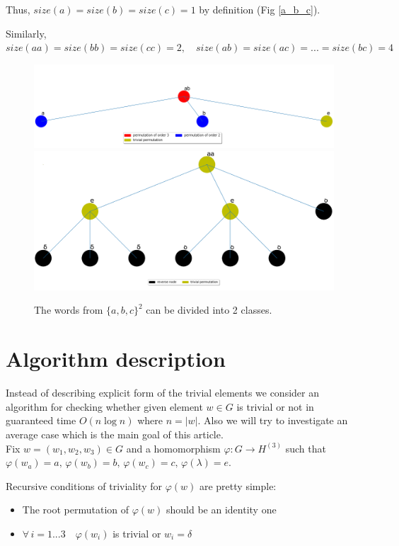 \documentclass[a4paper,12pt]{amsart}
\begin{document}
Thus, $size(a) = size(b) = size(c) = 1$ by definition (Fig \ref{a_b_c}).

Similarly, $size(aa) = size(bb) = size(cc) = 2, \quad size(ab) = size(ac) = ... = size(bc) = 4$

\begin{figure}[h]
	\centering
	\includegraphics[scale=0.3]{../graphs/ab.png}
	\includegraphics[scale=0.23]{../graphs/aa.png}
	\caption{The words from $\{a, b, c\}^2$ can be divided into 2 classes.}
	\label{second_order}
\end{figure}


\section{Algorithm description}

Instead of describing explicit form of the trivial elements we consider an algorithm
for checking whether given element $w \in G$ is trivial or not in guaranteed time
$O(n \log{n})$ where $n = |w|$. Also we will try to investigate an average case which is
the main goal of this article.
\\

Fix $w = (w_1, w_2, w_3) \in G$ and a homomorphism $\varphi : G \rightarrow H^{(3)}$ such that
$\varphi(w_a) = a, \, \varphi(w_b) = b, \, \varphi(w_c) = c, \, \varphi(\lambda) = e$.

\newpage

Recursive conditions of triviality for $\varphi(w)$ are pretty simple:

\begin{itemize}
	\item The root permutation of $\varphi(w)$ should be an identity one
	\item $\forall \, i = 1 ... 3 \quad \varphi(w_i)$ is trivial  or $w_i = \delta$
\end{itemize}
\end{document}
